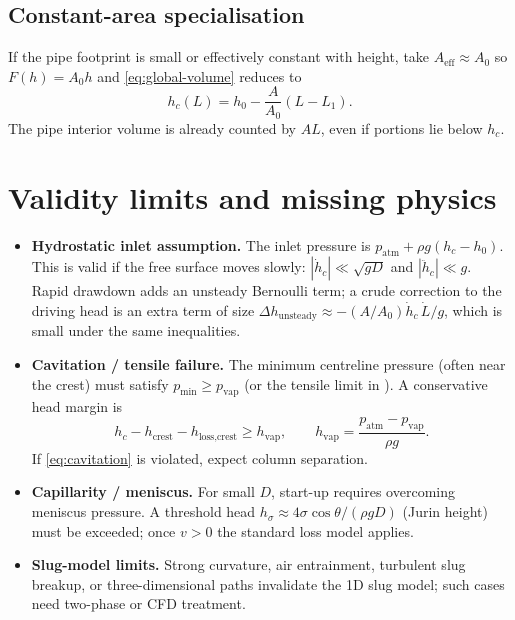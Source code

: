 \documentclass[11pt]{article}
\begin{document}
\subsection{Constant-area specialisation}
If the pipe footprint is small or effectively constant with height, take $A_{\mathrm{eff}}\approx A_0$ so $F(h)=A_0 h$ and \eqref{eq:global-volume} reduces to
\begin{equation}
  h_c(L) = h_0 - \frac{A}{A_0}(L-L_1).
  \label{eq:hc-L}
\end{equation}
The pipe interior volume is already counted by $AL$, even if portions lie below $h_c$.

\section{Validity limits and missing physics}
\label{sec:limits}
\begin{itemize}
  \item \textbf{Hydrostatic inlet assumption.} The inlet pressure is $p_{\mathrm{atm}}+\rho g(h_c-h_0)$. This is valid if the free surface moves slowly: $|\dot h_c|\ll \sqrt{gD}$ and $|\ddot h_c|\ll g$. Rapid drawdown adds an unsteady Bernoulli term; a crude correction to the driving head is an extra term of size $\Delta h_{\text{unsteady}}\approx -(A/A_0)\dot h_c\,\dot L/g$, which is small under the same inequalities.
  \item \textbf{Cavitation / tensile failure.} The minimum centreline pressure (often near the crest) must satisfy $p_{\min}\ge p_{\mathrm{vap}}$ (or the tensile limit in \cite{boatwright,vera,tyree}). A conservative head margin is
  \begin{equation}
    h_c - h_{\text{crest}} - h_{\text{loss,crest}} \ge h_{\mathrm{vap}},
    \qquad h_{\mathrm{vap}} = \frac{p_{\mathrm{atm}}-p_{\mathrm{vap}}}{\rho g}.
    \label{eq:cavitation}
  \end{equation}
  If \eqref{eq:cavitation} is violated, expect column separation.
  \item \textbf{Capillarity / meniscus.} For small $D$, start-up requires overcoming meniscus pressure. A threshold head $h_{\sigma}\approx 4\sigma\cos\theta/(\rho g D)$ (Jurin height) must be exceeded; once $v>0$ the standard loss model applies.
  \item \textbf{Slug-model limits.} Strong curvature, air entrainment, turbulent slug breakup, or three-dimensional paths invalidate the 1D slug model; such cases need two-phase or CFD treatment.
\end{itemize}
\end{document}
